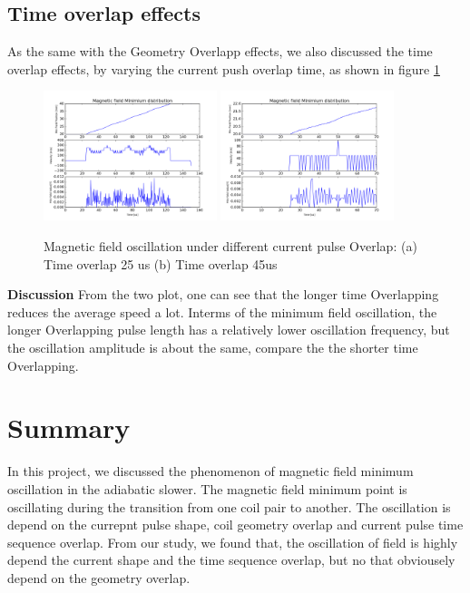 \documentclass[11pt, xcolor=dvipsnames]{article}
\begin{document}
\subsection{Time overlap effects}
As the same with the Geometry Overlapp effects, we also discussed the time overlap effects, by varying the current push overlap time, as shown in figure \ref{fig6} \\ \begin{figure}[!t] \label{fig6} \includegraphics[width = 0.45\textwidth]{sine_toverlap_5} \includegraphics[width = 0.45\textwidth]{sine_toverlap_9} \caption{Magnetic field oscillation under different current pulse Overlap: (a) Time overlap 25 us (b) Time overlap 45us} \end{figure}
\textbf{Discussion} From the two plot, one can see that the longer time Overlapping reduces the average speed a lot. Interms of the minimum field oscillation, the longer Overlapping pulse length has a relatively lower oscillation frequency, but the oscillation amplitude is about the same, compare the the shorter time Overlapping.

\section{Summary}
In this project, we discussed the phenomenon of magnetic field minimum oscillation in the adiabatic slower. The magnetic field minimum point is oscillating during the transition from one coil pair to another. The oscillation is depend on the currepnt pulse shape, coil geometry overlap and current pulse time sequence overlap. From our study, we found that, the oscillation of field is highly depend the current shape and the time sequence overlap, but no that obviousely depend on the geometry overlap. 
\end{document}
